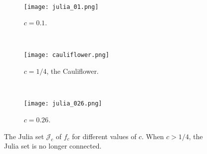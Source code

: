 \begin{figure*}[t!]
    \centering
    ~ 
    \begin{subfigure}[t]{0.3\textwidth}
        \centering
        \texttt{[image: julia\_01.png]}
        \caption{$c=0.1$.}
    \end{subfigure}	
	~
    \begin{subfigure}[t]{0.25\textwidth}
        \centering
        \texttt{[image: cauliflower.png]}
        \caption{$c=1/4$, the Cauliflower.}
    \end{subfigure}%
    ~ 
    \begin{subfigure}[t]{0.3\textwidth}
        \centering
        \texttt{[image: julia\_026.png]}
        \caption{$c=0.26$.}
    \end{subfigure}
    \caption{The Julia set $\mathcal J_c$ of $f_c$ for different values of $c$. When $c>1/4$, the Julia set is no longer connected.}
\end{figure*}
